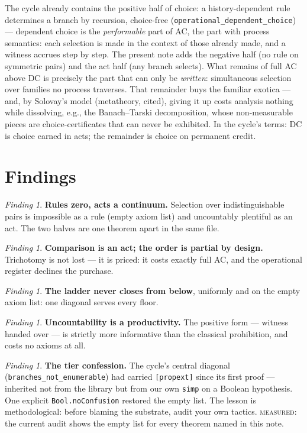 \documentclass[11pt]{article}
\theoremstyle{remark}
\newtheorem{finding}[thm]{Finding}
\newcommand{\MEASURED}{\textsc{measured}}
\begin{document}
The cycle already contains the positive half of choice: a
history-dependent rule determines a branch by recursion, choice-free
(\texttt{operational\_dependent\_choice}) --- dependent choice is the
\emph{performable} part of AC, the part with process semantics: each
selection is made in the context of those already made, and a witness
accrues step by step.  The present note adds the negative half (no rule
on symmetric pairs) and the act half (any branch selects).  What remains
of full AC above DC is precisely the part that can only be
\emph{written}: simultaneous selection over families no process
traverses.  That remainder buys the familiar exotica --- and, by
Solovay's model (metatheory, cited), giving it up costs analysis nothing
while dissolving, e.g., the Banach--Tarski decomposition, whose
non-measurable pieces are choice-certificates that can never be
exhibited.  In the cycle's terms: DC is choice earned in acts; the
remainder is choice on permanent credit.

\section{Findings}

\begin{finding}
\textbf{Rules zero, acts a continuum.}  Selection over
indistinguishable pairs is impossible as a rule (empty axiom list) and
uncountably plentiful as an act.  The two halves are one theorem apart
in the same file.
\end{finding}

\begin{finding}
\textbf{Comparison is an act; the order is partial by design.}
Trichotomy is not lost --- it is priced: it costs exactly full AC, and
the operational register declines the purchase.
\end{finding}

\begin{finding}
\textbf{The ladder never closes from below}, uniformly and on the empty
axiom list: one diagonal serves every floor.
\end{finding}

\begin{finding}
\textbf{Uncountability is a productivity.}  The positive form ---
witness handed over --- is strictly more informative than the classical
prohibition, and costs no axioms at all.
\end{finding}

\begin{finding}
\textbf{The tier confession.}  The cycle's central diagonal
(\texttt{branches\_not\_enumerable}) had carried \texttt{[propext]}
since its first proof --- inherited not from the library but from our
own \texttt{simp} on a Boolean hypothesis.  One explicit
\texttt{Bool.noConfusion} restored the empty list.  The lesson is
methodological: before blaming the substrate, audit your own tactics.
\MEASURED{}: the current audit shows the empty list for every theorem
named in this note.
\end{finding}
\end{document}
